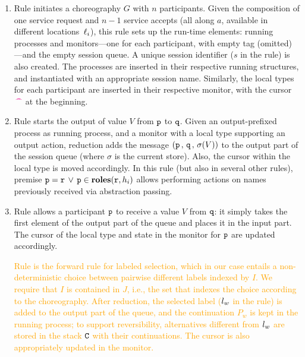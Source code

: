 \documentclass[runningheads]{llncs}
\newcommand{\erase}[1]{\textcolor{orange}{#1}}
\begin{document}
\begin{enumerate}[$\fwcolor{\blacktriangleright}$]
\item Rule  initiates a choreography  $G$ with $n$ participants.
Given the composition of one service request and $n-1$ service accepts (all along $a$, available in different locations~$\ell_i$),
this rule sets up the run-time elements:
running processes and  monitors---one for each participant, with empty tag (omitted)---and the empty session queue. 
A unique session identifier  ($s$ in the rule) is also created.
The processes are inserted in 
their respective running structures, and instantiated with an appropriate session name.
Similarly, the local types for each participant are inserted in their respective monitor, with the cursor $\,\textcolor{magenta}{\text{\textbf{\textasciicircum\!\!\textasciicircum}}}$ at the beginning.

\item Rule  starts the output of value $V$ from $\mathtt{p}$ to $\mathtt{q}$. Given an output-prefixed process as running process,
and a monitor with a local type supporting an output action, reduction adds the message $(\mathtt{p} \,,\, \mathtt{q} \,,\,\sigma(V))$ to the output part of the session queue (where $\sigma$ is the current store). Also, the cursor within the local type is moved accordingly.
In this rule (but also in several other rules), premise $\mathtt{p} = \mathtt{r} \,\vee\, \mathtt{p} \in \mathtt{\mathbf{roles}}(\mathtt{r}, h_i)$ allows performing actions on names previously received via abstraction passing.

\item Rule  allows a participant $\mathtt{p}$ to receive a value $V$ from $\mathtt{q}$: it 
simply takes the first element of the output part of the queue and places it in the input part.
The cursor of the local type and state in the  monitor for $\mathtt{p}$ are updated accordingly.

 
\erase{Rule  is the forward rule for labeled selection, which in our case entails a non-deterministic choice between 
pairwise different labels indexed by $I$. %
We require that $I$ is contained in $J$, i.e., the set that indexes the choice according to the choreography. 
After reduction, the selected label ($l_w$ in the rule) is added to the output part of the queue, and the continuation $P_w$ is kept in the running process;
to support reversibility,
alternatives different from $l_w$ are stored in the stack $\mathtt{C}$ with their continuations.
The cursor is also appropriately updated in the  monitor.}


\end{enumerate}
\end{document}
